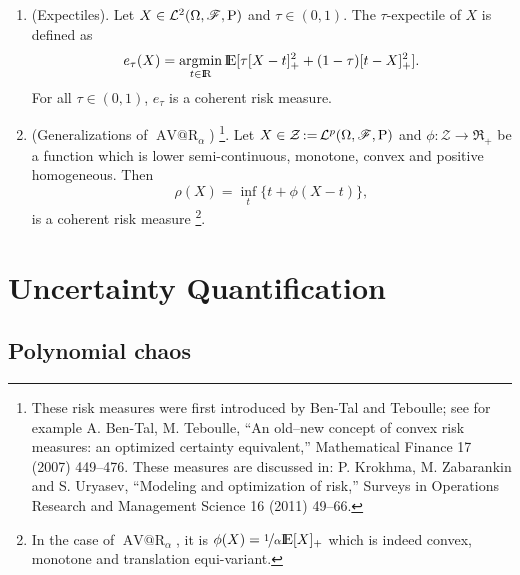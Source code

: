 \documentclass[a4paper,10pt]{scrbook}
\begin{document}
\begin{enumerate}
 \item (Expectiles). Let $X\in\mathcal{L}^2(\Omega,\mathscr{F},\mathrm{P})$ and $\tau\in(0,1)$. The $\tau$-expectile of 
       $X$ is defined as 
       \[
        e_{\tau}(X) = \argmin_{t\in\Re} \E[\tau [X-t]_+^2 + (1-\tau)[t-X]_+^2].
       \]
      For all $\tau\in(0,1)$, $e_{\tau}$ is a coherent risk measure.
 \item (Generalizations of $\operatorname{AV@R}_\alpha$)%
	     \footnote{%
	       These risk measures were first introduced by Ben-Tal and Teboulle; see for example
               A. Ben-Tal, M. Teboulle, ``An old–new concept of convex risk measures: an
	       optimized certainty equivalent,'' Mathematical Finance 17 (2007) 449--476.
	       These measures are discussed in: P. Krokhma, M. Zabarankin and S. Uryasev,
	       ``Modeling and optimization of risk,'' 
	       Surveys in Operations Research and Management Science 16 (2011) 49--66.%
	      }. 
	Let $X\in\mathcal{Z}{}\mathop{\mathrel{:}=}{} \mathcal{L}^p(\Omega,\mathscr{F},\mathrm{P})$ and $\phi:\mathcal{Z}\to\Re_+$ be a function
	which is lower semi-continuous, monotone, convex and positive homogeneous. Then
	\[
	 \rho(X) = \inf_t \{t + \phi(X-t)\},
	\]
        is a coherent risk measure%
	      \footnote{In the case of $\operatorname{AV@R}_\alpha$, it is $\phi(X) = \nicefrac{1}{\alpha}\E[X]_+$
	      which is indeed convex, monotone and translation equi-variant.}.
\end{enumerate}

\chapter{Uncertainty Quantification}
\section{Polynomial chaos}
\end{document}
